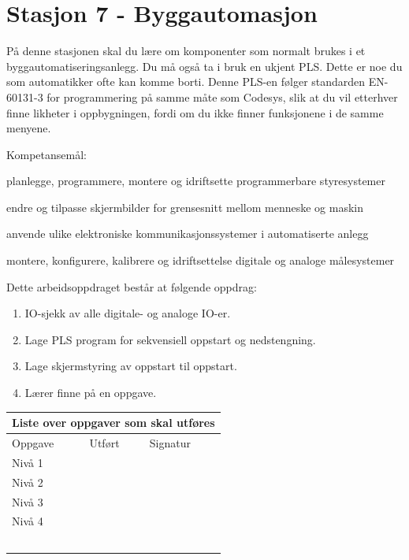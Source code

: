 
\noindent
\section*{Stasjon 7 - Byggautomasjon}

\vskip 5pt

På denne stasjonen skal du lære om komponenter som normalt brukes i et byggautomatiseringsanlegg. Du må også ta i bruk en ukjent PLS. Dette er noe du som automatikker ofte kan komme borti. Denne PLS-en følger standarden EN-60131-3 for programmering på samme måte som Codesys, slik at du vil etterhver finne likheter i oppbygningen, fordi om du ikke finner funksjonene i de samme menyene. 

Kompetansemål:

planlegge, programmere, montere og idriftsette programmerbare styresystemer

endre og tilpasse skjermbilder for grensesnitt mellom menneske og maskin

anvende ulike elektroniske kommunikasjonssystemer i automatiserte anlegg

montere, konfigurere, kalibrere og idriftsettelse digitale og analoge målesystemer

Dette arbeidsoppdraget består at følgende oppdrag:
\begin{enumerate}
	\item IO-sjekk av alle digitale- og analoge IO-er. 
	\item Lage PLS program for sekvensiell oppstart og nedstengning. 
	\item Lage skjermstyring av oppstart til oppstart.
	\item Lærer finne på en oppgave. 
\end{enumerate}
\begin{center}
\begin{tabular}{ | m{8cm} | m{1cm}| m{2cm} | } 
\hline
\multicolumn{3}{|c|}{Liste over oppgaver som skal utføres} \\
	\hline
	Oppgave	& Utført & Signatur \\ 
	\hline
	\hline
	\cellcolor{green!60}Nivå 1	& & \\ 
	\hline
	\cellcolor{yellow!60}Nivå 2	& & \\ 
	\hline
	\cellcolor{orange!60}Nivå 3	& & \\ 
	\hline
	\cellcolor{red!60}Nivå 4	& & \\ 
	\hline
	& & \\ 
	\hline
	& & \\ 
	\hline
	& & \\ 
	\hline
	& & \\ 
	\hline
	& & \\ 
	\hline
\end{tabular}
\end{center}
